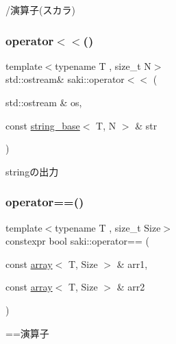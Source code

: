 /演算子(スカラ) 

\mbox{\label{namespacesaki_abf390d4e6c19fdb92d3a68afb7e71032}} 
\subsubsection{\texorpdfstring{operator$<$$<$()}{operator<<()}}
{\footnotesize\ttfamily template$<$typename T , size\+\_\+t N$>$ \\
std\+::ostream\& saki\+::operator$<$$<$ (\begin{DoxyParamCaption}\item[{std\+::ostream \&}]{os,  }\item[{const \mbox{\hyperlink{classsaki_1_1string__base}{string\+\_\+base}}$<$ T, N $>$ \&}]{str }\end{DoxyParamCaption})}



stringの出力 

\mbox{\label{namespacesaki_a5ce8a66ed6ece15fa9ddeaec2746374d}} 
\subsubsection{\texorpdfstring{operator==()}{operator==()}\hspace{0.1cm}{\footnotesize\ttfamily [1/14]}}
{\footnotesize\ttfamily template$<$typename T , size\+\_\+t Size$>$ \\
constexpr bool saki\+::operator== (\begin{DoxyParamCaption}\item[{const \mbox{\hyperlink{classsaki_1_1array}{array}}$<$ T, Size $>$ \&}]{arr1,  }\item[{const \mbox{\hyperlink{classsaki_1_1array}{array}}$<$ T, Size $>$ \&}]{arr2 }\end{DoxyParamCaption})}



==演算子 

\mbox{\label{namespacesaki_a57a23952c9becf92a51ff1742f645d66}} 
